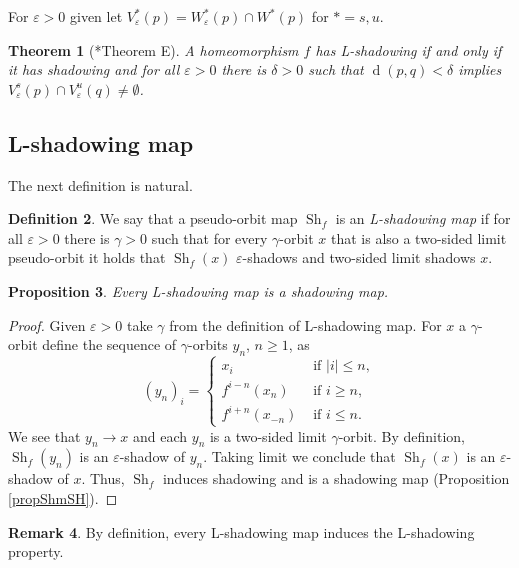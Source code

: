 \documentclass[12pt]{amsart}
\theoremstyle{plain}
\newtheorem{thm}{Theorem}[section]
\newtheorem{prop}[thm]{Proposition}
\theoremstyle{definition}
\newtheorem{rmk}[thm]{Remark}
\newtheorem{df}[thm]{Definition}
\theoremstyle{remark}
\DeclareMathOperator{\dist}{d}
\DeclareMathOperator{\shm}{Sh}
\renewcommand{\epsilon}{\varepsilon}
\begin{document}
For $\epsilon>0$ given let $V^*_\epsilon(p)=W^*_\epsilon(p)\cap W^*(p)$ for $*=s,u$.

\begin{thm}[\cite{ACCV20}*{Theorem E}]
	\label{thmE-ACCV}
	A homeomorphism $f$ has L-shadowing if and only if it has shadowing and for all $\epsilon>0$ there is $\delta>0$ such that $\dist(p,q)<\delta$ implies $V^s_\epsilon(p)\cap V^u_\epsilon(q)\neq\emptyset$.
\end{thm}


\subsection{L-shadowing map} The next definition is natural.

\begin{df} We say that a pseudo-orbit map $\shm_f$ is an
	\textit{L-shadowing map} if for all $\epsilon>0$ there is $\gamma>0$ such that
	for every $\gamma$-orbit $x$ that is also a two-sided limit pseudo-orbit
	it holds that $\shm_f(x)$ $\epsilon$-shadows and two-sided limit shadows $x$.
\end{df}

\begin{prop}
	\label{propLshmImplicaShm}
	Every L-shadowing map is a shadowing map.
\end{prop}

\begin{proof}
	Given $\epsilon>0$ take $\gamma$ from the definition of L-shadowing map.
	For $x$ a $\gamma$-orbit define the sequence of $\gamma$-orbits $y_n$, $n\geq 1$, as
	\[
	(y_n)_i=\left\{
	\begin{array}{ll}
		x_i             & \text{ if }|i|\leq n,\\
		f^{i-n}(x_n)    & \text{ if }i\geq n,\\
		f^{i+n}(x_{-n}) & \text{ if }i\leq n.
	\end{array}
	\right.
	\]
	We see that $y_n\to x$ and each $y_n$ is a two-sided limit $\gamma$-orbit.
	By definition, $\shm_f(y_n)$ is an $\epsilon$-shadow of $y_n$.
	Taking limit we conclude that $\shm_f(x)$ is an $\epsilon$-shadow of $x$.
	Thus, $\shm_f$ induces shadowing and is a shadowing map (Proposition \ref{propShmSH}).
\end{proof}

\begin{rmk}
	\label{rmkLshmLshp}
	By definition, every L-shadowing map induces the L-shadowing property.
\end{rmk}
\end{document}
